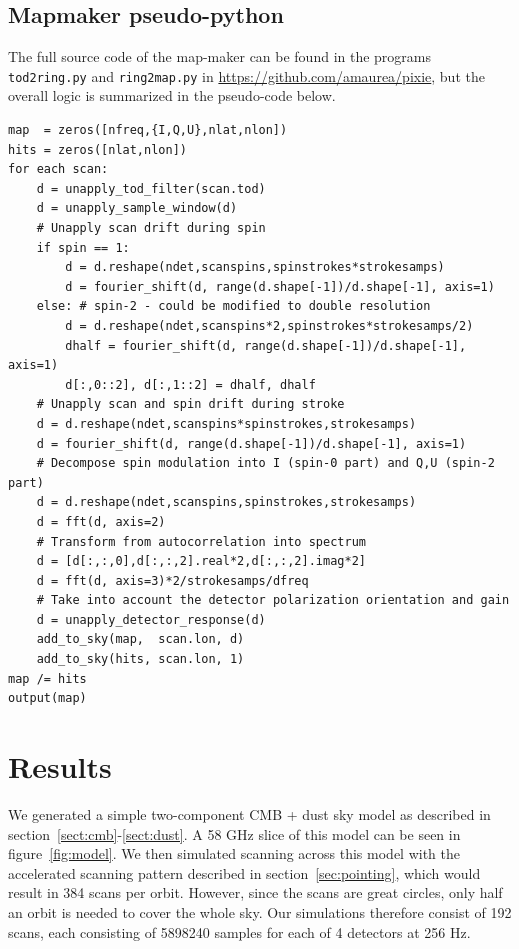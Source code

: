 \documentclass{article}
\begin{document}
\subsection{Mapmaker pseudo-python}
The full source code of the map-maker can be found in the
programs \texttt{tod2ring.py} and \texttt{ring2map.py} in
\url{https://github.com/amaurea/pixie}, but the overall logic is summarized in
the pseudo-code below.
\begin{lstlisting}
map  = zeros([nfreq,{I,Q,U},nlat,nlon])
hits = zeros([nlat,nlon])
for each scan:
	d = unapply_tod_filter(scan.tod)
	d = unapply_sample_window(d)
	# Unapply scan drift during spin
	if spin == 1:
		d = d.reshape(ndet,scanspins,spinstrokes*strokesamps)
		d = fourier_shift(d, range(d.shape[-1])/d.shape[-1], axis=1)
	else: # spin-2 - could be modified to double resolution
		d = d.reshape(ndet,scanspins*2,spinstrokes*strokesamps/2)
		dhalf = fourier_shift(d, range(d.shape[-1])/d.shape[-1], axis=1)
		d[:,0::2], d[:,1::2] = dhalf, dhalf
	# Unapply scan and spin drift during stroke
	d = d.reshape(ndet,scanspins*spinstrokes,strokesamps)
	d = fourier_shift(d, range(d.shape[-1])/d.shape[-1], axis=1)
	# Decompose spin modulation into I (spin-0 part) and Q,U (spin-2 part)
	d = d.reshape(ndet,scanspins,spinstrokes,strokesamps)
	d = fft(d, axis=2)
	# Transform from autocorrelation into spectrum
	d = [d[:,:,0],d[:,:,2].real*2,d[:,:,2].imag*2]
	d = fft(d, axis=3)*2/strokesamps/dfreq
	# Take into account the detector polarization orientation and gain
	d = unapply_detector_response(d)
	add_to_sky(map,  scan.lon, d)
	add_to_sky(hits, scan.lon, 1)
map /= hits
output(map)
\end{lstlisting}

\section{Results}
We generated a simple two-component CMB + dust sky model as described in
section~\ref{sect:cmb}-\ref{sect:dust}. A 58 GHz slice of this
model can be seen in figure~\ref{fig:model}. We then simulated
scanning across this model with the accelerated scanning pattern
described in section~\ref{sec:pointing}, which would result in 384
scans per orbit.
However, since the scans are great circles, only half an orbit
is needed to cover the whole sky. Our simulations therefore consist
of 192 scans, each consisting of 5898240 samples for each of 4
detectors at 256 Hz.
\end{document}
